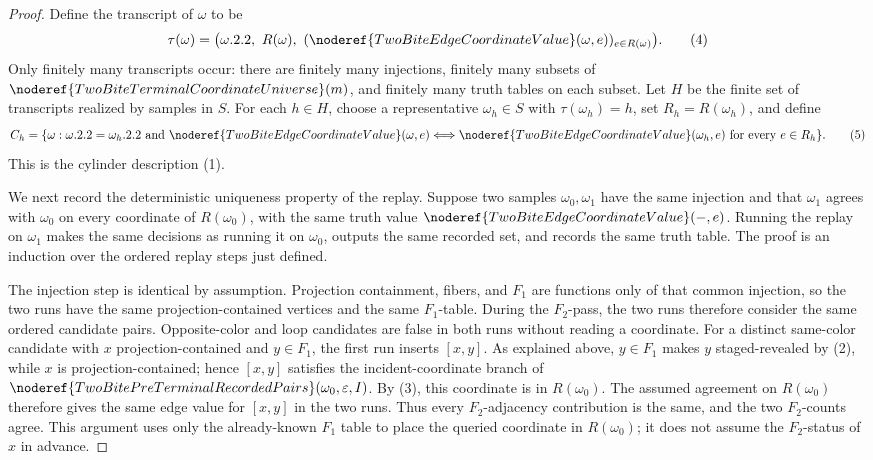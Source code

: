 \begin{proof}
Define the transcript of \(\omega\) to be
\[
\tau(\omega)=
\bigl(\omega.2.2,\ R(\omega),\
(\noderef{TwoBiteEdgeCoordinateValue}(\omega,e))_{e\in R(\omega)}\bigr).
\tag{4}
\]
Only finitely many transcripts occur: there are finitely many injections,
finitely many subsets of
\(\noderef{TwoBiteTerminalCoordinateUniverse}(m)\), and finitely many truth
tables on each subset.  Let \(H\) be the finite set of transcripts realized by
samples in \(S\).  For each \(h\in H\), choose a representative
\(\omega_h\in S\) with \(\tau(\omega_h)=h\), set \(R_h=R(\omega_h)\), and
define
\[
C_h=\{\omega:\omega.2.2=\omega_h.2.2
\text{ and }
\noderef{TwoBiteEdgeCoordinateValue}(\omega,e)
\Longleftrightarrow
\noderef{TwoBiteEdgeCoordinateValue}(\omega_h,e)
\text{ for every }e\in R_h\}.
\tag{5}
\]
This is the cylinder description (1).

We next record the deterministic uniqueness property of the replay.  Suppose
two samples \(\omega_0,\omega_1\) have the same injection and that
\(\omega_1\) agrees with \(\omega_0\) on every coordinate of \(R(\omega_0)\),
with the same truth value
\(\noderef{TwoBiteEdgeCoordinateValue}(-,e)\).  Running the replay on
\(\omega_1\) makes the same decisions as running it on \(\omega_0\), outputs
the same recorded set, and records the same truth table.  The proof is an
induction over the ordered replay steps just defined.

The injection step is identical by assumption.  Projection containment,
fibers, and \(F_1\) are functions only of that common injection, so the two
runs have the same projection-contained vertices and the same \(F_1\)-table.
During the \(F_2\)-pass, the two runs therefore consider the same ordered
candidate pairs.  Opposite-color and loop candidates are false in both runs
without reading a coordinate.  For a distinct same-color candidate with
\(x\) projection-contained and \(y\in F_1\), the first run inserts \([x,y]\).
As explained above, \(y\in F_1\) makes \(y\) staged-revealed by (2), while
\(x\) is projection-contained; hence \([x,y]\) satisfies the
incident-coordinate branch of
\(\noderef{TwoBitePreTerminalRecordedPairs}(\omega_0,\varepsilon,I)\).  By
(3), this coordinate is in \(R(\omega_0)\).  The assumed agreement on
\(R(\omega_0)\) therefore gives the same edge value for \([x,y]\) in the two
runs.  Thus every \(F_2\)-adjacency contribution is the same, and the two
\(F_2\)-counts agree.  This argument uses only the already-known \(F_1\) table
to place the queried coordinate in \(R(\omega_0)\); it does not assume the
\(F_2\)-status of \(x\) in advance.


\end{proof}
